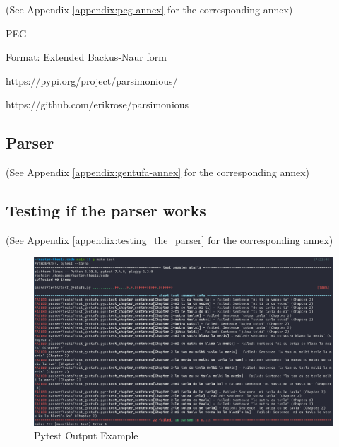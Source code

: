 (See Appendix \ref{appendix:peg-annex} for the corresponding annex)

PEG

Format: Extended Backus-Naur form

https://pypi.org/project/parsimonious/

https://github.com/erikrose/parsimonious


\subsection{Parser}
\label{sub:parser}

(See Appendix \ref{appendix:gentufa-annex} for the corresponding annex)

\subsection{Testing if the parser works}
\label{sub:testing_if_the_parser_works}

(See Appendix \ref{appendix:testing_the_parser} for the corresponding annex)

\begin{figure}[H]
\hspace{-3cm}
\includegraphics[scale=0.43]{images/pytest_output.png}
\caption{Pytest Output Example}
\end{figure}

